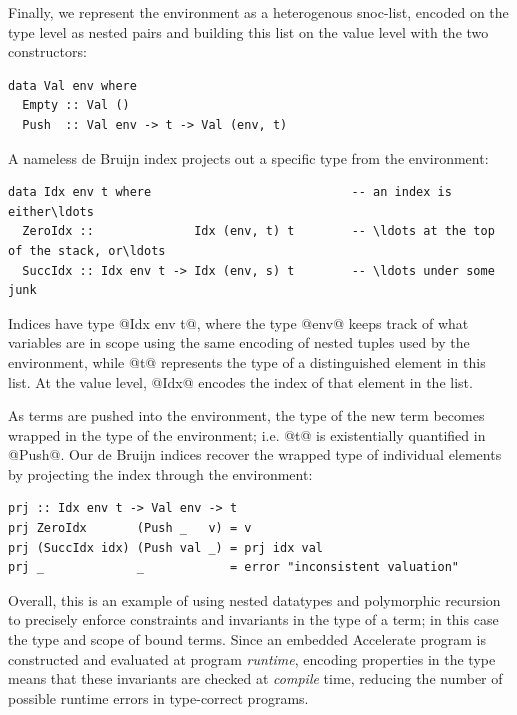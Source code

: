 Finally, we represent the environment as a heterogenous snoc-list, encoded on
the type level as nested pairs and building this list on the value level with
the two constructors:
%
\begin{lstlisting}[style=haskell]
data Val env where
  Empty :: Val ()
  Push  :: Val env -> t -> Val (env, t)
\end{lstlisting}
%
A nameless de Bruijn index projects out a specific type from the environment:
%
\begin{lstlisting}[style=haskell]
data Idx env t where                            -- an index is either\ldots
  ZeroIdx ::              Idx (env, t) t        -- \ldots at the top of the stack, or\ldots
  SuccIdx :: Idx env t -> Idx (env, s) t        -- \ldots under some junk
\end{lstlisting}
%
Indices have type @Idx env t@, where the type @env@ keeps track of what
variables are in scope using the same encoding of nested tuples used by the
environment, while @t@ represents the type of a distinguished element in this
list. At the value level, @Idx@ encodes the index of that element in the list.

As terms are pushed into the environment, the type of the new term becomes
wrapped in the type of the environment; i.e. @t@ is existentially quantified in
@Push@. Our de Bruijn indices recover the wrapped type of individual elements by
projecting the index through the environment:
%
\begin{lstlisting}[style=haskell]
prj :: Idx env t -> Val env -> t
prj ZeroIdx       (Push _   v) = v
prj (SuccIdx idx) (Push val _) = prj idx val
prj _             _            = error "inconsistent valuation"
\end{lstlisting}

Overall, this is an example of using nested datatypes and polymorphic recursion
to precisely enforce constraints and invariants in the type of a term; in this
case the type and scope of bound terms. Since an embedded Accelerate program is
constructed and evaluated at program \emph{runtime}, encoding properties in the
type means that these invariants are checked at \emph{compile} time, reducing
the number of possible runtime errors in type-correct programs.




\endinput

MMTC: Chapter 2 (Background): Don't bother introducing Haskell and things like
parallelism vs concurrency etc. What you need to discuss is (1) data parallelism
and (2) how GPGPU programming is data parallel programming. Then, (3) the idea
of embedded languages and runtime code generation. However, don't go into too
much details at this point. After all, much of this has been discussed in
existing literature already. I'd suggest to pick 1-2 examples and use them to
drive the explanations (and at the same time give people an idea for the feel of
Accelerate programs).


